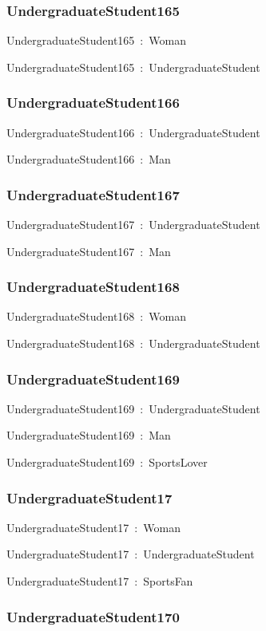 \documentclass{article}
\begin{document}
\subsubsection*{UndergraduateStudent165}

UndergraduateStudent165~:~Woman

UndergraduateStudent165~:~UndergraduateStudent

\subsubsection*{UndergraduateStudent166}

UndergraduateStudent166~:~UndergraduateStudent

UndergraduateStudent166~:~Man

\subsubsection*{UndergraduateStudent167}

UndergraduateStudent167~:~UndergraduateStudent

UndergraduateStudent167~:~Man

\subsubsection*{UndergraduateStudent168}

UndergraduateStudent168~:~Woman

UndergraduateStudent168~:~UndergraduateStudent

\subsubsection*{UndergraduateStudent169}

UndergraduateStudent169~:~UndergraduateStudent

UndergraduateStudent169~:~Man

UndergraduateStudent169~:~SportsLover

\subsubsection*{UndergraduateStudent17}

UndergraduateStudent17~:~Woman

UndergraduateStudent17~:~UndergraduateStudent

UndergraduateStudent17~:~SportsFan

\subsubsection*{UndergraduateStudent170}
\end{document}
